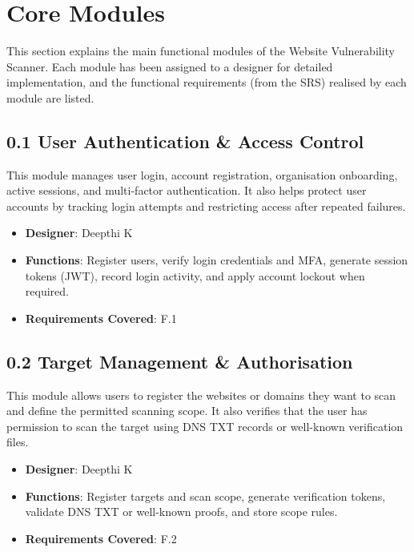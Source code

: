 \documentclass[11pt,a4paper]{article}
\begin{document}
\newpage
\section{Core Modules}

This section explains the main functional modules of the Website Vulnerability Scanner. Each module has been assigned to a designer for detailed implementation, and the functional requirements (from the SRS) realised by each module are listed.

\subsection{0.1 User Authentication \& Access Control}
This module manages user login, account registration, organisation onboarding, active sessions, and multi-factor authentication. It also helps protect user accounts by tracking login attempts and restricting access after repeated failures.
\begin{itemize}[noitemsep]
    \item \textbf{Designer}: Deepthi K
    \item \textbf{Functions}: Register users, verify login credentials and MFA, generate session tokens (JWT), record login activity, and apply account lockout when required.
    \item \textbf{Requirements Covered}: F.1
\end{itemize}

\subsection{0.2 Target Management \& Authorisation}
This module allows users to register the websites or domains they want to scan and define the permitted scanning scope. It also verifies that the user has permission to scan the target using DNS TXT records or well-known verification files.
\begin{itemize}[noitemsep]
    \item \textbf{Designer}: Deepthi K
    \item \textbf{Functions}: Register targets and scan scope, generate verification tokens, validate DNS TXT or well-known proofs, and store scope rules.
    \item \textbf{Requirements Covered}: F.2
\end{itemize}
\end{document}

